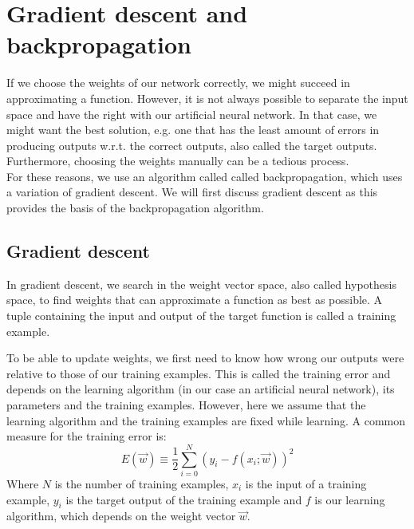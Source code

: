 

\section{Gradient descent and backpropagation} %
\label{sec:gradient_descent_and_backpropagation}
If we choose the weights of our network correctly, we might succeed in approximating a function.
However, it is not always possible to separate the input space and have the right with our artificial neural network.
In that case, we might want the best solution, e.g. one that has the least amount of errors in producing outputs w.r.t. the correct outputs, also called the target outputs. Furthermore, choosing the weights manually can be a tedious process.\\
For these reasons, we use an algorithm called called backpropagation, which uses a variation of gradient descent. We will first discuss gradient descent as this provides the basis of the backpropagation algorithm.

\subsection{Gradient descent} %
\label{ssub:gradient_descent}
In gradient descent, we search in the weight vector space, also called hypothesis space, to find weights that can approximate a function as best as possible. A tuple containing the input and output of the target function is called a training example.

To be able to update weights, we first need to know how wrong our outputs were relative to those of our training examples.
This is called the training error and depends on the learning algorithm (in our case an artificial neural network), its parameters and the training examples. However, here we assume that the learning algorithm and the training examples are fixed while learning.
A common measure for the training error is:
\begin{equation}
    E(\overrightarrow{w}) \equiv \frac{1}{2} \sum_{i=0}^N (y_i - f(x_i;\overrightarrow{w}))^2
\end{equation}
Where $N$ is the number of training examples, $x_i$ is the input of a training example, $y_i$ is the target output of the training example and $f$ is our learning algorithm, which depends on the weight vector $\overrightarrow{w}$.\\

